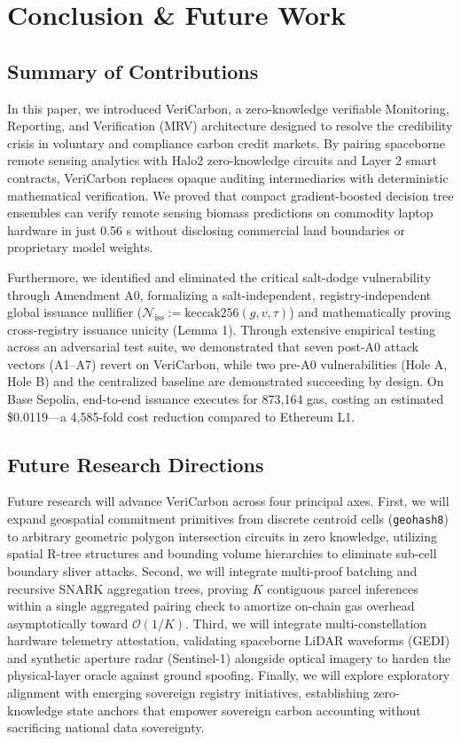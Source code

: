 \documentclass[preprint,12pt]{elsarticle}
\begin{document}
\section{Conclusion \& Future Work}

\subsection{Summary of Contributions}

In this paper, we introduced VeriCarbon, a zero-knowledge verifiable Monitoring, Reporting, and Verification (MRV) architecture designed to resolve the credibility crisis in voluntary and compliance carbon credit markets. By pairing spaceborne remote sensing analytics with Halo2 zero-knowledge circuits and Layer 2 smart contracts, VeriCarbon replaces opaque auditing intermediaries with deterministic mathematical verification. We proved that compact gradient-boosted decision tree ensembles can verify remote sensing biomass predictions on commodity laptop hardware in just 0.56 s without disclosing commercial land boundaries or proprietary model weights.

Furthermore, we identified and eliminated the critical salt-dodge vulnerability through Amendment A0, formalizing a salt-independent, registry-independent global issuance nullifier ($\mathcal{N}_{\text{iss}} := \text{keccak256}(g, v, \tau)$) and mathematically proving cross-registry issuance unicity (Lemma 1). Through extensive empirical testing across an adversarial test suite, we demonstrated that seven post-A0 attack vectors (A1–A7) revert on VeriCarbon, while two pre-A0 vulnerabilities (Hole A, Hole B) and the centralized baseline are demonstrated succeeding by design. On Base Sepolia, end-to-end issuance executes for 873,164 gas, costing an estimated \$0.0119—a 4,585-fold cost reduction compared to Ethereum L1.

\subsection{Future Research Directions}

Future research will advance VeriCarbon across four principal axes. First, we will expand geospatial commitment primitives from discrete centroid cells (\texttt{geohash8}) to arbitrary geometric polygon intersection circuits in zero knowledge, utilizing spatial R-tree structures and bounding volume hierarchies to eliminate sub-cell boundary sliver attacks. Second, we will integrate multi-proof batching and recursive SNARK aggregation trees, proving $K$ contiguous parcel inferences within a single aggregated pairing check to amortize on-chain gas overhead asymptotically toward $\mathcal{O}(1/K)$. Third, we will integrate multi-constellation hardware telemetry attestation, validating spaceborne LiDAR waveforms (GEDI) and synthetic aperture radar (Sentinel-1) alongside optical imagery to harden the physical-layer oracle against ground spoofing. Finally, we will explore exploratory alignment with emerging sovereign registry initiatives, establishing zero-knowledge state anchors that empower sovereign carbon accounting without sacrificing national data sovereignty.
\end{document}

